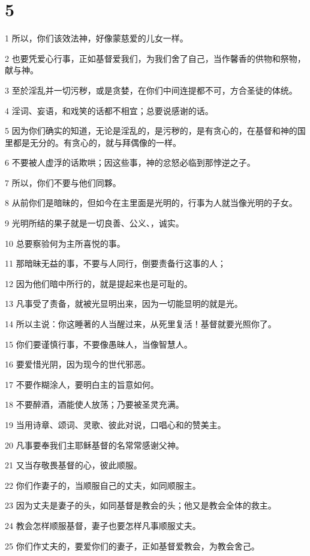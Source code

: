 \chapter{5}

\par 1 所以，你们该效法神，好像蒙慈爱的儿女一样。
\par 2 也要凭爱心行事，正如基督爱我们，为我们舍了自己，当作馨香的供物和祭物，献与神。
\par 3 至於淫乱并一切污秽，或是贪婪，在你们中间连提都不可，方合圣徒的体统。
\par 4 淫词、妄语，和戏笑的话都不相宜；总要说感谢的话。
\par 5 因为你们确实的知道，无论是淫乱的，是污秽的，是有贪心的，在基督和神的国里都是无分的。有贪心的，就与拜偶像的一样。
\par 6 不要被人虚浮的话欺哄；因这些事，神的忿怒必临到那悖逆之子。
\par 7 所以，你们不要与他们同夥。
\par 8 从前你们是暗昧的，但如今在主里面是光明的，行事为人就当像光明的子女。
\par 9 光明所结的果子就是一切良善、公义、，诚实。
\par 10 总要察验何为主所喜悦的事。
\par 11 那暗昧无益的事，不要与人同行，倒要责备行这事的人；
\par 12 因为他们暗中所行的，就是提起来也是可耻的。
\par 13 凡事受了责备，就被光显明出来，因为一切能显明的就是光。
\par 14 所以主说：你这睡著的人当醒过来，从死里复活！基督就要光照你了。
\par 15 你们要谨慎行事，不要像愚昧人，当像智慧人。
\par 16 要爱惜光阴，因为现今的世代邪恶。
\par 17 不要作糊涂人，要明白主的旨意如何。
\par 18 不要醉酒，酒能使人放荡；乃要被圣灵充满。
\par 19 当用诗章、颂词、灵歌、彼此对说，口唱心和的赞美主。
\par 20 凡事要奉我们主耶稣基督的名常常感谢父神。
\par 21 又当存敬畏基督的心，彼此顺服。
\par 22 你们作妻子的，当顺服自己的丈夫，如同顺服主。
\par 23 因为丈夫是妻子的头，如同基督是教会的头；他又是教会全体的救主。
\par 24 教会怎样顺服基督，妻子也要怎样凡事顺服丈夫。
\par 25 你们作丈夫的，要爱你们的妻子，正如基督爱教会，为教会舍己。
